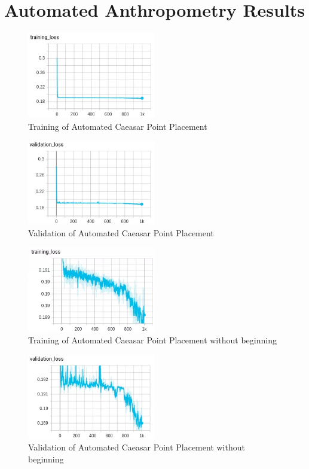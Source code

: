 \section{Automated Anthropometry Results}

\begin{figure}[!htb]
	\caption{Training of Automated Caeasar Point Placement}
	\centering
\includegraphics[width=0.5\textwidth]{images/training.png}
\end{figure}
\begin{figure}[!htb]
	\caption{Validation of Automated Caeasar Point Placement}
	\centering
\includegraphics[width=0.5\textwidth]{images/validation.png}
\end{figure}
 \begin{figure}[!htb]
	\caption{Training of Automated Caeasar Point Placement without beginning}
	\centering
\includegraphics[width=0.5\textwidth]{images/train_close.png}
\end{figure}
\begin{figure}[!htb]
	\caption{Validation of Automated Caeasar Point Placement without beginning}
	\centering
\includegraphics[width=0.5\textwidth]{images/val_close.png}
\end{figure}

